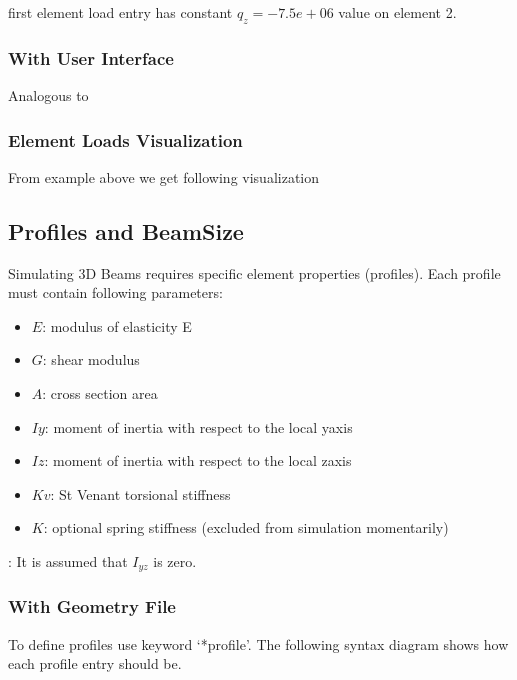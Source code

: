 \documentclass[letterpaper,10pt,english]{sphinxmanual}
\begin{document}
first element load entry has constant \(q_z=-7.5e+06\) value on element 2.


\subsubsection{With User Interface}
\label{\detokenize{making_a_model:id14}}
Analogous to {\hyperref[\detokenize{making_a_model:nodes-input}]{}}


\subsubsection{Element Loads Visualization}
\label{\detokenize{making_a_model:element-loads-visualization}}
From example above we get following visualization

\noindent{}


\subsection{Profiles and BeamSize}
\label{\detokenize{making_a_model:profiles-and-beamsize}}
Simulating 3D Beams requires specific element properties (profiles). Each profile must contain following parameters:
\begin{itemize}
\item {} 
\(E\): modulus of elasticity E

\item {} 
\(G\): shear modulus

\item {} 
\(A\): cross section area

\item {} 
\(Iy\): moment of inertia with respect to the local y\sphinxhyphen{}axis

\item {} 
\(Iz\): moment of inertia with respect to the local z\sphinxhyphen{}axis

\item {} 
\(Kv\): St Venant torsional stiffness

\item {} 
\(K\): optional spring stiffness (excluded from simulation momentarily)

\end{itemize}

: It is assumed that \(I_{yz}\) is zero.


\subsubsection{With Geometry File}
\label{\detokenize{making_a_model:id15}}
To define profiles use keyword ‘*profile’.
The following syntax diagram shows how each profile entry should be.
\end{document}
